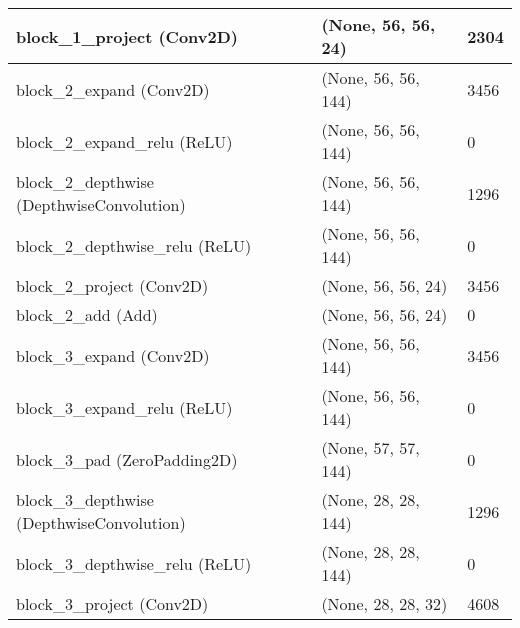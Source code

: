 \documentclass{article}
\begin{document}
\begin{center}
\begin{longtable}[h]{ p{}  p{}  p{}}
block\_1\_project (Conv2D)                         & (None, 56, 56, 24)   & 2304     \\ \hline
block\_2\_expand (Conv2D)                          & (None, 56, 56, 144)  & 3456     \\ \hline
block\_2\_expand\_relu (ReLU)                      & (None, 56, 56, 144)  & 0        \\ \hline
block\_2\_depthwise (DepthwiseConvolution)         & (None, 56, 56, 144)  & 1296     \\ \hline
block\_2\_depthwise\_relu (ReLU)                   & (None, 56, 56, 144)  & 0        \\ \hline
block\_2\_project (Conv2D)                         & (None, 56, 56, 24)   & 3456     \\ \hline
block\_2\_add (Add)                                & (None, 56, 56, 24)   & 0        \\ \hline
block\_3\_expand (Conv2D)                          & (None, 56, 56, 144)  & 3456     \\ \hline
block\_3\_expand\_relu (ReLU)                      & (None, 56, 56, 144)  & 0        \\ \hline
block\_3\_pad (ZeroPadding2D)                      & (None, 57, 57, 144)  & 0        \\ \hline
block\_3\_depthwise (DepthwiseConvolution)         & (None, 28, 28, 144)  & 1296     \\ \hline
block\_3\_depthwise\_relu (ReLU)                   & (None, 28, 28, 144)  & 0        \\ \hline
block\_3\_project (Conv2D)                         & (None, 28, 28, 32)   & 4608     \\ \hline

\end{longtable}
\end{center}
\end{document}

